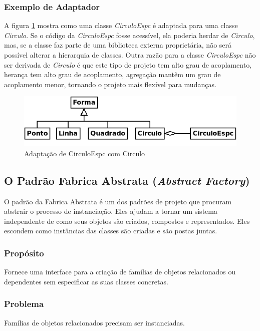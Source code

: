 \documentclass[
	11pt,				%
	openright,
	twoside,			%
	a4paper,			%
	english,			%
	french,
	brazil,				%
	sumario=tradicional
	]{abntex2}
\begin{document}
\subsubsection{Exemplo de Adaptador}
A figura \ref{fig:adaptCirc} mostra como uma classe \emph{CirculoEspc} é adaptada para uma classe \emph{Circulo}. Se o código da \emph{CirculoEspc} fosse acessível, ela poderia herdar de \emph{Circulo}, mas, se a classe faz parte de uma biblioteca externa proprietária, não será possível alterar a hierarquia de classes. Outra razão para a classe \emph{CirculoEspc} não ser derivada de \emph{Circulo} é que este tipo de projeto tem alto grau de acoplamento, herança tem alto grau de acoplamento, agregação mantêm um grau de acoplamento menor, tornando o projeto mais flexível para mudanças. 

\begin{figure}[h]
\begin{center}
\includegraphics[scale=0.5]{adaptCirc.png}
\caption{Adaptação de CirculoEspc com Circulo}\label{fig:adaptCirc}
\end{center}
\end{figure}


\subsection{O Padrão Fabrica Abstrata (\textit{Abstract Factory})}

O padrão da Fabrica Abstrata é um dos padrões de projeto que procuram abstrair o processo de instanciação. Eles ajudam a tornar um sistema independente de como seus objetos são criados, compostos e representados. Eles escondem como instâncias das classes são criadas e são postas juntas.

\subsubsection{Propósito}
Fornece uma interface para a criação de famílias de objetos relacionados ou dependentes sem especificar as suas classes concretas.

\subsubsection{Problema}
Famílias de objetos relacionados precisam ser instanciadas.
\end{document}
